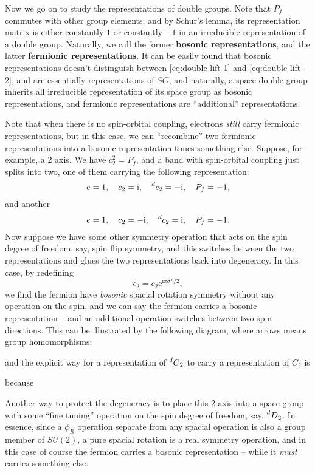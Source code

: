 \documentclass[hyperref, a4paper]{article}
\newcommand*{\ii}{\mathrm{i}}
\newcommand*{\ee}{\mathrm{e}}
\newcommand*{\concept}[1]{{\textbf{#1}}}
\begin{document}
Now we go on to study the representations of double groups. Note that $P_f$ commutes with other group elements,
and by Schur's lemma, its representation matrix is either constantly $1$ or constantly $-1$ in an irreducible representation 
of a double group. Naturally, we call the former \concept{bosonic representations}, and the latter \concept{fermionic representations}.
It can be easily found that bosonic representations doesn't distinguish between \eqref{eq:double-lift-1} 
and \eqref{eq:double-lift-2}, and are essentially representations of $SG$, and naturally, a space double 
group inherits all irreducible representation of its space group as bosonic representations, and 
fermionic representations are ``additional'' representations. 

Note that when there is no spin-orbital coupling, electrons \emph{still} carry fermionic representations,
but in this case, we can ``recombine'' two fermionic representations into a bosonic representation times something else.
Suppose, for example, a 2 axis. We have $c_2^2 = P_f$, and a band with spin-orbital coupling just splits 
into two, one of them carrying the following representation:
\[
    e = 1, \quad c_2 = \ii, \quad \prescript{d}{}{c_2} = - \ii, \quad P_f = -1,
\]
and another 
\[
    e = 1, \quad c_2 = - \ii, \quad \prescript{d}{}{c_2} = \ii, \quad P_f = -1.
\]
Now suppose we have some other symmetry operation that acts on the spin degree of freedom, say,
spin flip symmetry, and this switches between the two representations and glues the two representations back into degeneracy. 
In this case, by redefining 
\begin{equation}
    \tilde{c}_2 = c_2 \ee^{\ii \pi \sigma^x / 2},
\end{equation}
we find the fermion have \emph{bosonic} spacial rotation symmetry without any operation on the spin,
and we can say the fermion carries a bosonic representation -- and an additional operation switches between two spin directions.
This can be illustrated by the following diagram, where arrows means group homomorphisms:

and the explicit way for a representation of $\prescript{d}{}C_2$ to carry a representation of $C_2$ is 

because

Another way to protect the degeneracy is to place this 2 axis into a space group with some ``fine tuning'' 
operation on the spin degree of freedom, say, $\prescript{d}{}{D_2}$.
In essence, since a $\phi_R$ operation separate from any spacial operation is also a group member of $SU(2)$,
a pure spacial rotation is a real symmetry operation, and in this case of course the fermion carries 
a bosonic representation -- while it \emph{must} carries something else.
\end{document}
